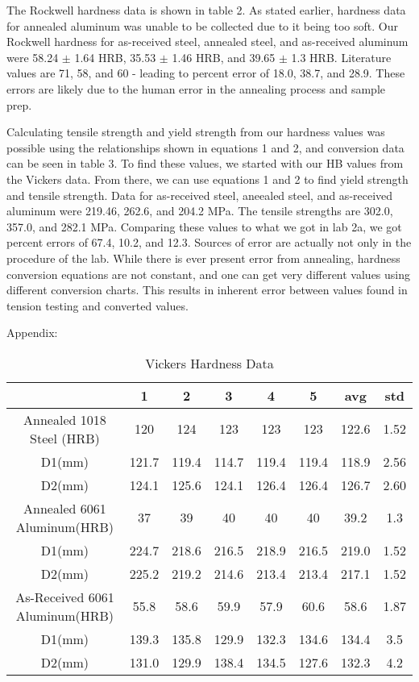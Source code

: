 \documentclass{article}
\begin{document}
The Rockwell hardness data is shown in table 2. As stated earlier, hardness data for annealed aluminum was unable to be collected due to it being too soft. Our Rockwell hardness for as-received steel, annealed steel, and as-received aluminum were 58.24 $\pm$ 1.64 HRB, 35.53 $\pm$ 1.46 HRB, and 39.65 $\pm$ 1.3 HRB. Literature values are 71, 58, and 60 - leading to percent error of 18.0, 38.7, and 28.9. These errors are likely due to the human error in the annealing process and sample prep.

Calculating tensile strength and yield strength from our hardness values was possible using the relationships shown in equations 1 and 2, and conversion data can be seen in table 3. To find these values, we started with our HB values from the Vickers data. From there, we can use equations 1 and 2 to find yield strength and tensile strength. Data for as-received steel, aneealed steel, and as-received aluminum were 219.46, 262.6, and 204.2 MPa. The tensile strengths are 302.0, 357.0, and 282.1 MPa. Comparing these values to what we got in lab 2a, we got percent errors of 67.4, 10.2, and 12.3. Sources of error are actually not only in the procedure of the lab. While there is ever present error from annealing, hardness conversion equations are not constant, and one can get very different values using different conversion charts. This results in inherent error between values found in tension testing and converted values.
\clearpage

Appendix:\\

\begin{table}[h]
\centering
\caption{Vickers Hardness Data}
\begin{tabular}{||c | c | c | c | c | c | c | c||}
	\hline
	\ 	&
	1	&	2	&	3	&	4	&	5 & avg & std\\
	\hline\hline
	Annealed 1018 Steel	(HRB)	&
	120	&	124	&	123	&	123	&	123 & 122.6 & 1.52\\
	D1(mm)	&
	121.7	& 119.4 & 114.7 & 119.4 & 119.4 & 118.9 & 2.56\\
	D2(mm)	&
	124.1	& 125.6	& 124.1	& 126.4	& 126.4 & 126.7 & 2.60\\
	Annealed 6061 Aluminum(HRB)	&
	37	&	39	&	40	&	40	&	40 & 39.2 & 1.3\\
	D1(mm)	&
	224.7	& 218.6 & 216.5 & 218.9 & 216.5 & 219.0 & 1.52\\
	D2(mm)	&
	225.2	& 219.2 & 214.6 & 213.4 & 213.4 & 217.1 & 1.52\\
	As-Received 6061 Aluminum(HRB)	&
	55.8	&	58.6	&	59.9	&	57.9	&	60.6 & 58.6 & 1.87\\
	D1(mm)	&
	139.3	& 135.8 & 129.9 & 132.3 & 134.6 & 134.4 & 3.5\\
	D2(mm)	&
	131.0	& 129.9 & 138.4 & 134.5 & 127.6 & 132.3 & 4.2\\
	\hline
\end{tabular}
\end{table}
\end{document}
